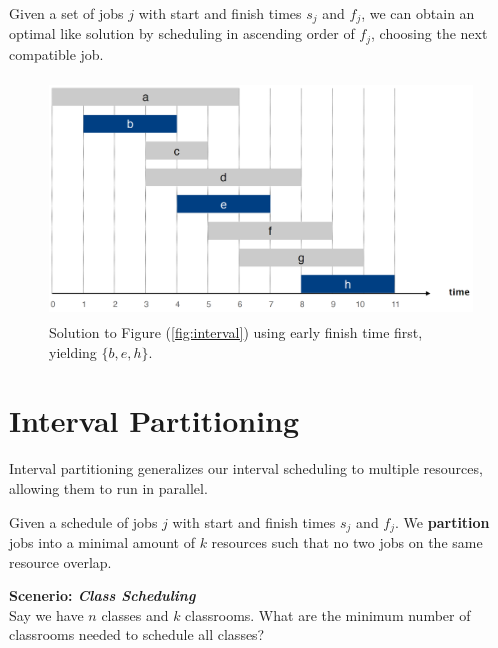 \noindent
\begin{theo}
    Given a set of jobs $j$ with start and finish times $s_j$ and $f_j$, we can obtain an optimal like solution by scheduling in ascending order of $f_j$,
    choosing the next compatible job.
\end{theo}
\begin{figure}[h]
    \begin{center}
      \includegraphics[height=2.5in]{./Sections/sched/interval/interval_sol.png}
    \end{center}
     \caption{Solution to Figure (\ref{fig:interval}) using early finish time first, yielding $\{b,e,h\}$.}\label{fig:interval_sol}
\end{figure}
\section{Interval Partitioning}
Interval partitioning generalizes our interval scheduling to multiple resources, allowing them to run in parallel.\\

\begin{Def}
    Given a schedule of jobs $j$ with start and finish times $s_j$ and $f_j$. We \textbf{partition} jobs into a minimal amount of $k$ resources such that no two jobs on the same resource overlap.
\end{Def}
\textbf{Scenerio: \textit{Class Scheduling}}\\
\noindent
Say we have $n$ classes and $k$ classrooms. What are the minimum number of classrooms needed to schedule all classes?\\

